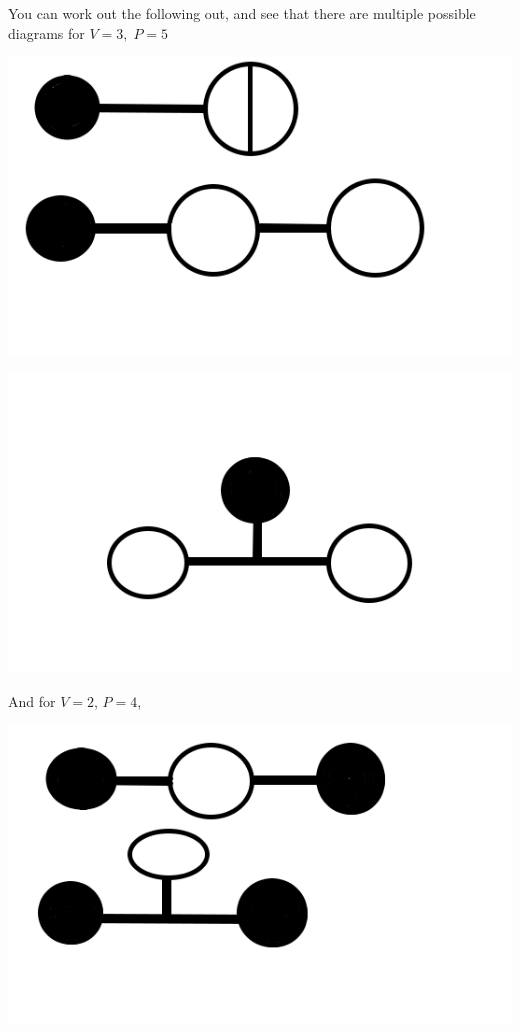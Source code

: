 \documentclass[12pt,epsf]{article}
\begin{document}
You can work out the following out, and see that there are multiple
possible diagrams for $V=3,\; P=5$
\begin{center}
\includegraphics[scale = .2]{feynmandiagram4.png}
\end{center}
\begin{center}
\includegraphics[scale = .2]{feynmandiagram5.png}
\end{center}

And for $V=2$, $P=4$,
\begin{center}
\includegraphics[scale = .2]{feynmandiagram6.png}
\end{center}
\end{document}
